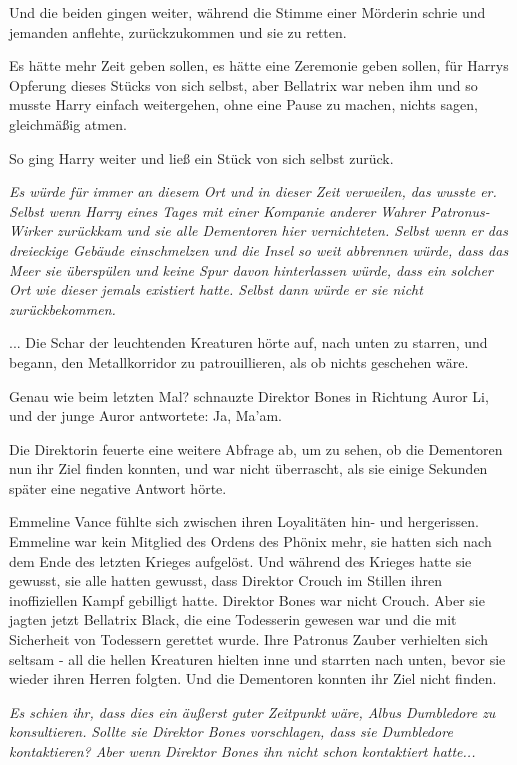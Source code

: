 Und die beiden gingen weiter, während die Stimme einer Mörderin schrie und
jemanden anflehte, zurückzukommen und sie zu retten.

Es hätte mehr Zeit geben sollen, es hätte eine Zeremonie geben sollen, für
Harrys Opferung dieses Stücks von sich selbst, aber Bellatrix war neben ihm und
so musste Harry einfach weitergehen, ohne eine Pause zu machen, nichts sagen,
gleichmäßig atmen.

So ging Harry weiter und ließ ein Stück von sich selbst zurück.

\emph{Es würde für immer an diesem Ort
und in dieser Zeit verweilen, das wusste er. Selbst wenn Harry eines Tages mit
einer Kompanie anderer Wahrer Patronus-Wirker zurückkam und sie alle Dementoren
hier vernichteten. Selbst wenn er das dreieckige Gebäude einschmelzen und die
Insel so weit abbrennen würde, dass das Meer sie überspülen und keine Spur davon
hinterlassen würde, dass ein solcher Ort wie dieser jemals existiert hatte.
Selbst dann würde er sie nicht zurückbekommen.}

... Die Schar der leuchtenden Kreaturen hörte auf, nach unten zu starren, und
begann, den Metallkorridor zu patrouillieren, als ob nichts geschehen wäre.

\glqq{}Genau wie beim letzten Mal?\grqq{} schnauzte Direktor Bones in Richtung
Auror Li, und der junge Auror antwortete: \glqq{}Ja, Ma'am.\grqq{}

Die Direktorin feuerte eine weitere Abfrage ab, um zu sehen, ob die Dementoren
nun ihr Ziel finden konnten, und war nicht überrascht, als sie einige Sekunden
später eine negative Antwort hörte.

Emmeline Vance fühlte sich zwischen ihren Loyalitäten hin- und hergerissen.
Emmeline war kein Mitglied des Ordens des Phönix mehr, sie hatten sich nach dem
Ende des letzten Krieges aufgelöst. Und während des Krieges hatte sie gewusst,
sie alle hatten gewusst, dass Direktor Crouch im Stillen ihren inoffiziellen
Kampf gebilligt hatte. Direktor Bones war nicht Crouch. Aber sie jagten jetzt
Bellatrix Black, die eine Todesserin gewesen war und die mit Sicherheit von
Todessern gerettet wurde. Ihre Patronus Zauber verhielten sich seltsam - all die
hellen Kreaturen hielten inne und starrten nach unten, bevor sie wieder ihren
Herren folgten. Und die Dementoren konnten ihr Ziel nicht finden.

\emph{Es schien ihr, dass dies ein äußerst guter Zeitpunkt wäre, Albus
Dumbledore zu konsultieren.} \emph{Sollte sie Direktor Bones vorschlagen, dass
sie Dumbledore kontaktieren? Aber wenn Direktor Bones ihn nicht schon
kontaktiert hatte...}

